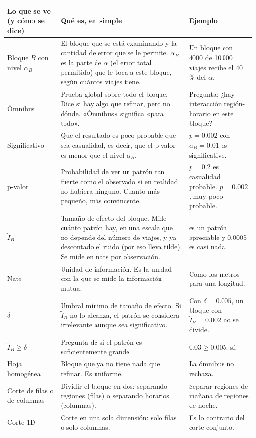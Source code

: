 \documentclass[11pt,a4paper]{article}
\makeatletter
\newenvironment{partes}{%
  \begin{longtable}{@{}>{\raggedright\arraybackslash}p{4.3cm}>{\raggedright\arraybackslash}p{6.0cm}>{\raggedright\arraybackslash}p{5.0cm}@{}}
  \toprule \textbf{Lo que se ve (y cómo se dice)} & \textbf{Qué es, en simple} & \textbf{Ejemplo}\\ \midrule \endhead}{%
  \bottomrule\end{longtable}}
\newcommand{\se}[1]{\newline{\small\color{ucspblue}(se dice «#1»)}}
\makeatother
\begin{document}
\begin{partes}
Bloque $B$ con nivel $\alpha_B$ \se{bloque B con nivel alfa sub B} & El bloque que se está examinando y la cantidad de error que se le permite. $\alpha_B$ es la parte de $\alpha$ (el error total permitido) que le toca a este bloque, según cuántos viajes tiene. & Un bloque con 4000 de 10\,000 viajes recibe el 40\,\% del $\alpha$. \\
Ómnibus \se{ómnibus} & Prueba global sobre todo el bloque. Dice si hay algo que refinar, pero no dónde. «Ómnibus» significa «para todo». & Pregunta: ¿hay interacción región-horario en este bloque? \\
Significativo & Que el resultado es poco probable que sea casualidad, es decir, que el p-valor es menor que el nivel $\alpha_B$. & $p=0.002$ con $\alpha_B=0.01$ es significativo. \\
p-valor \se{pe valor} & Probabilidad de ver un patrón tan fuerte como el observado si en realidad no hubiera ninguno. Cuanto más pequeño, más convincente. & $p=0.2$ es casualidad probable. $p=0.002$, muy poco probable. \\
$\tilde I_B$ \se{I tilde de B} & Tamaño de efecto del bloque. Mide cuánto patrón hay, en una escala que no depende del número de viajes, y ya descontado el ruido (por eso lleva tilde). Se mide en nats por observación. & 0.03 es un patrón apreciable y 0.0005 es casi nada. \\
Nats \se{nats} & Unidad de información. Es la unidad con la que se mide la información mutua. & Como los metros para una longitud. \\
$\delta$ \se{delta} & Umbral mínimo de tamaño de efecto. Si $\tilde I_B$ no lo alcanza, el patrón se considera irrelevante aunque sea significativo. & Con $\delta=0.005$, un bloque con $\tilde I_B=0.002$ no se divide. \\
$\tilde I_B\ge\delta$ \se{I tilde de B mayor o igual que delta} & Pregunta de si el patrón es suficientemente grande. & $0.03\ge0.005$: sí. \\
Hoja homogénea & Bloque que ya no tiene nada que refinar. Es uniforme. & La ómnibus no rechaza. \\
Corte de filas o de columnas & Dividir el bloque en dos: separando regiones (filas) o separando horarios (columnas). & Separar regiones de mañana de regiones de noche. \\
Corte 1D \se{corte uno-D, o corte unidimensional} & Corte en una sola dimensión: solo filas o solo columnas. & Es lo contrario del corte conjunto. \\

\end{partes}
\end{document}
